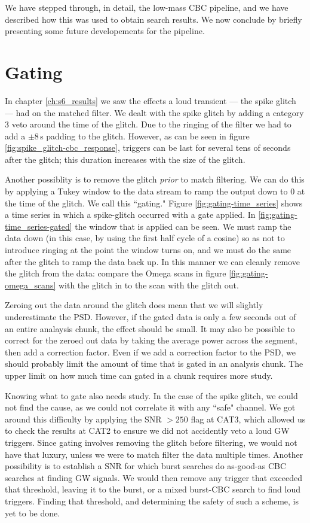 
We have stepped through, in detail, the low-mass \ac{CBC} pipeline, and we have described how this was used to obtain search results. We now conclude by briefly presenting some future developements for the pipeline.

\section{Gating}

In chapter \ref{ch:s6_results} we saw the effects a loud transient --- the spike glitch --- had on the matched filter. We dealt with the spike glitch by adding a category 3 veto around the time of the glitch. Due to the ringing of the filter we had to add a $\pm 8\,$s padding to the glitch. However, as can be seen in figure \ref{fig:spike_glitch-cbc_response}, triggers can be last for several tens of seconds after the glitch; this duration increases with the size of the glitch.

Another possiblity is to remove the glitch \emph{prior} to match filtering. We can do this by applying a Tukey window to the data stream to ramp the output down to $0$ at the time of the glitch. We call this ``gating." Figure \ref{fig:gating-time_series} shows a time series in which a spike-glitch occurred with a gate applied.  In \ref{fig:gating-time_series-gated} the window that is applied can be seen. We must ramp the data down (in this case, by using the first half cycle of a cosine) so as not to introduce ringing at the point the window turns on, and we must do the same after the glitch to ramp the data back up. In this manner we can cleanly remove the glitch from the data: compare the Omega scans in figure \ref{fig:gating-omega_scans} with the glitch in to the scan with the glitch out.

Zeroing out the data around the glitch does mean that we will slightly underestimate the \ac{PSD}. However, if the gated data is only a few seconds out of an entire analaysis chunk, the effect should be small. It may also be possible to correct for the zeroed out data by taking the average power across the segment, then add a correction factor. Even if we add a correction factor to the \ac{PSD}, we should probably limit the amount of time that is gated in an analysis chunk. The upper limit on how much time can gated in a chunk requires more study.

Knowing what to gate also needs study. In the case of the spike glitch, we could not find the cause, as we could not correlate it with any ``safe" channel. We got around this difficulty by applying the \ac{SNR} $> 250$ flag at CAT3, which allowed us to check the results at CAT2 to ensure we did not accidently veto a loud \ac{GW} triggers. Since gating involves removing the glitch before filtering, we would not have that luxury, unless we were to match filter the data multiple times. Another possibility is to establish a \ac{SNR} for which burst searches do as-good-as \ac{CBC} searches at finding \ac{GW} signals. We would then remove any trigger that exceeded that threshold, leaving it to the burst, or a mixed burst-\ac{CBC} search to find loud triggers. Finding that threshold, and determining the safety of such a scheme, is yet to be done.

